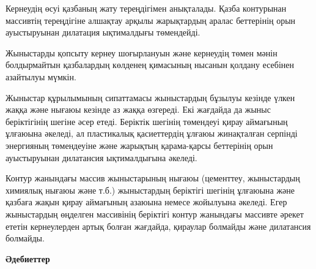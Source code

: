 Кернеудің өсуі қазбаның жату тереңдігімен анықталады. Қазба контурынан
массивтің тереңдігіне алшақтау арқылы жарықтардың аралас беттерінің орын
ауыстыруынан дилатация ықтималдығы төмендейді.

Жыныстарды қопсыту кернеу шоғырлануын және кернеудің төмен мәнін
болдырмайтын қазбалардың көлденең қимасының нысанын қолдану есебінен
азайтылуы мүмкін.

Жыныстар құрылымының сипаттамасы жыныстардың бұзылуы кезінде үлкен жаққа
және нығаюы кезінде аз жаққа өзгереді. Екі жағдайда да жыныс
беріктігінің шегіне әсер етеді. Беріктік шегінің төмендеуі қирау
аймағының ұлғаюына әкеледі, ал пластикалық қасиеттердің ұлғаюы
жинақталған серпінді энергияның төмендеуіне және жарықтың қарама-қарсы
беттерінің орын ауыстыруынан дилатансия ықтималдығына әкеледі.

Контур жанындағы массив жыныстарының нығаюы (цементтеу, жыныстардың
химиялық нығаюы және т.б.) жыныстардың беріктігі шегінің ұлғаюына және
қазбаға жақын қирау аймағының азаюына немесе жойылуына әкеледі. Егер
жыныстардың өңделген массивінің беріктігі контур жанындағы массивте
әрекет ететін кернеулерден артық болған жағдайда, қираулар болмайды және
дилатансия болмайды.

{\bfseries Әдебиеттер}

